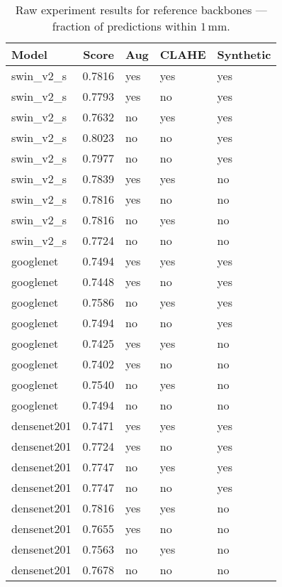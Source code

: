 \documentclass{article}
\begin{document}
\begin{table}[H]
    \centering
    \footnotesize
    \setlength{\tabcolsep}{5pt}
    \caption{Raw experiment results for reference backbones — fraction of predictions within $1\,$mm.}
    \label{tab:raw}
    \begin{tabular}{l r l l l}
        \toprule
        Model & Score & Aug & CLAHE & Synthetic \\
        \midrule
        swin\_v2\_s   & 0.7816 & yes & yes & yes \\
        swin\_v2\_s   & 0.7793 & yes & no  & yes \\
        swin\_v2\_s   & 0.7632 & no  & yes & yes \\
        swin\_v2\_s   & 0.8023 & no  & no  & yes \\
        swin\_v2\_s   & 0.7977 & no  & no  & yes \\
        swin\_v2\_s   & 0.7839 & yes & yes & no  \\
        swin\_v2\_s   & 0.7816 & yes & no  & no  \\
        swin\_v2\_s   & 0.7816 & no  & yes & no  \\
        swin\_v2\_s   & 0.7724 & no  & no  & no  \\
        googlenet      & 0.7494 & yes & yes & yes \\
        googlenet      & 0.7448 & yes & no  & yes \\
        googlenet      & 0.7586 & no  & yes & yes \\
        googlenet      & 0.7494 & no  & no  & yes \\
        googlenet      & 0.7425 & yes & yes & no  \\
        googlenet      & 0.7402 & yes & no  & no  \\
        googlenet      & 0.7540 & no  & yes & no  \\
        googlenet      & 0.7494 & no  & no  & no  \\
        densenet201    & 0.7471 & yes & yes & yes \\
        densenet201    & 0.7724 & yes & no  & yes \\
        densenet201    & 0.7747 & no  & yes & yes \\
        densenet201    & 0.7747 & no  & no  & yes \\
        densenet201    & 0.7816 & yes & yes & no  \\
        densenet201    & 0.7655 & yes & no  & no  \\
        densenet201    & 0.7563 & no  & yes & no  \\
        densenet201    & 0.7678 & no  & no  & no  \\
        \bottomrule
    \end{tabular}
\end{table}
\end{document}
